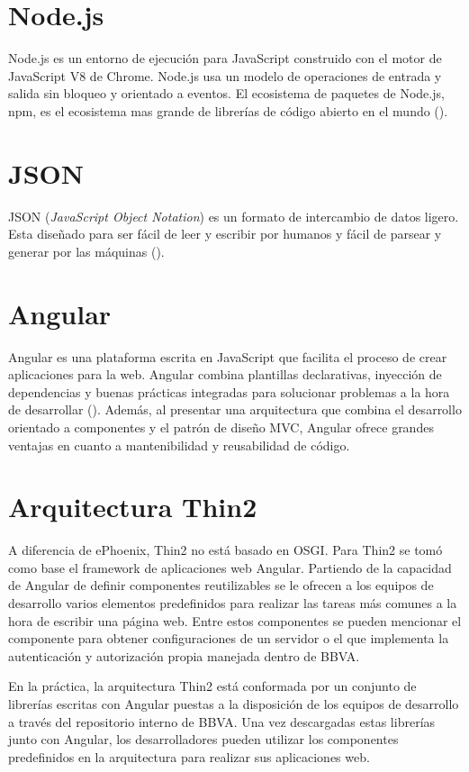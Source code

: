\section{Node.js}
Node.js es un entorno de ejecución para JavaScript construido con el motor de JavaScript V8
de Chrome. Node.js usa un modelo de operaciones de entrada y salida sin bloqueo y orientado a eventos.
El ecosistema de paquetes de Node.js, npm, es el ecosistema mas grande de librerías
de código abierto en el mundo (\cite{NODE}).

\section{JSON}
JSON (\emph{JavaScript Object Notation}) es un formato de intercambio de datos ligero.
Esta diseñado para ser fácil de leer y escribir por humanos y fácil de parsear y generar
por las máquinas (\cite{JSON}).

\section{Angular}
Angular es una plataforma escrita en JavaScript que facilita el proceso
de crear aplicaciones para la web. Angular combina plantillas declarativas, inyección de dependencias
y buenas prácticas integradas para solucionar problemas a la hora de desarrollar (\cite{ANGULAR}).
Además, al presentar una arquitectura que combina el desarrollo orientado a componentes
y el patrón de diseño MVC, Angular ofrece grandes ventajas en cuanto a mantenibilidad
y reusabilidad de código.

\section{Arquitectura Thin2}

A diferencia de ePhoenix, Thin2 no está basado en OSGI.
Para Thin2 se tomó como base el framework de aplicaciones web Angular. Partiendo
de la capacidad de Angular de definir componentes reutilizables se le ofrecen a los
equipos de desarrollo varios elementos predefinidos para realizar las tareas más
comunes a la hora de escribir una página web. Entre estos componentes se pueden
mencionar el componente para obtener configuraciones de un servidor o el que implementa
la autenticación y autorización propia manejada dentro de BBVA.

En la práctica, la arquitectura Thin2 está conformada por un conjunto de librerías
escritas con Angular puestas a la disposición de los equipos de desarrollo a través
del repositorio interno de BBVA. Una vez descargadas estas librerías junto con
Angular, los desarrolladores pueden utilizar los componentes predefinidos en la
arquitectura para realizar sus aplicaciones web.

